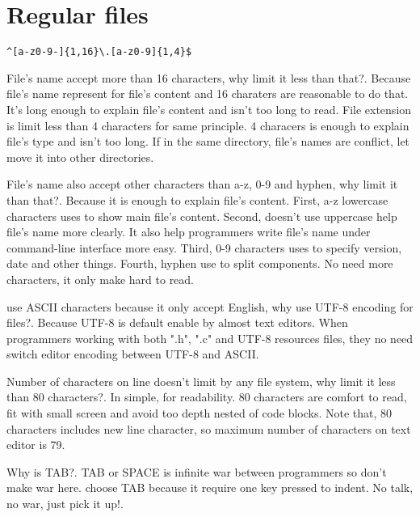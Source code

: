 \section{Regular files}

\begin{crules}
     \verb/^[a-z0-9-]{1,16}\.[a-z0-9]{1,4}$/
\end{crules}

File's name accept more than 16 characters, why limit it less than that?.
Because file's name represent for file's content and 16 charaters are
reasonable to do that. It's long enough to explain file's content and
isn't too long to read. File extension is limit less than 4 characters for
same principle. 4 characers is enough to explain file's type and isn't
too long. If in the same directory, file's names are conflict, let move
it into other directories.

File's name also accept other characters than a-z, 0-9 and hyphen,
why limit it than that?. Because it is enough to explain file's content.
First, a-z lowercase characters uses to show main file's content.
Second, doesn't use uppercase help file's name more clearly. It also help
programmers write file's name under \mbox{command-line} interface more easy.
Third, 0-9 characters uses to specify version, date and other things.
Fourth, hyphen use to split components. No need more characters,
it only make hard to read.

\pkgname{} use ASCII characters because it only accept English, why use
\mbox{UTF-8} encoding for files?. Because \mbox{UTF-8} is default enable by
almost text editors. When programmers working with both ".h", ".c" and
\mbox{UTF-8} resources files, they no need switch editor encoding between
\mbox{UTF-8} and ASCII.

Number of characters on line doesn't limit by any file system, why limit it
less than 80 characters?. In simple, for readability. 80 characters are
comfort to read, fit with small screen and avoid too depth nested of
code blocks. Note that, 80 characters includes new line character,
so maximum number of characters on text editor is 79.

Why is TAB?. TAB or SPACE is infinite war between programmers so don't
make war here. \pkgname{} choose TAB because it require one key pressed to
indent. No talk, no war, just pick it up!.
